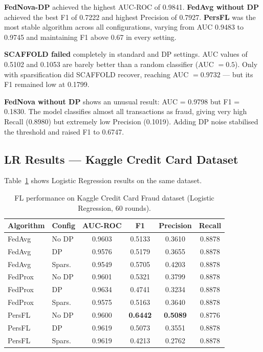 \documentclass[12pt, a4paper]{article}
\begin{document}
\textbf{FedNova-DP} achieved the highest AUC-ROC of 0.9841. \textbf{FedAvg without DP} achieved the best F1 of 0.7222 and highest Precision of 0.7927. \textbf{PersFL} was the most stable algorithm across all configurations, varying from AUC 0.9483 to 0.9745 and maintaining F1 above 0.67 in every setting.

\textbf{SCAFFOLD failed} completely in standard and DP settings. AUC values of 0.5102 and 0.1053 are barely better than a random classifier (AUC $= 0.5$). Only with sparsification did SCAFFOLD recover, reaching AUC $= 0.9732$ --- but its F1 remained low at 0.1799.

\textbf{FedNova without DP} shows an unusual result: AUC = 0.9798 but F1 = 0.1830. The model classifies almost all transactions as fraud, giving very high Recall (0.8980) but extremely low Precision (0.1019). Adding DP noise stabilised the threshold and raised F1 to 0.6747.

\subsection{LR Results --- Kaggle Credit Card Dataset}

Table~\ref{tab:lr_results} shows Logistic Regression results on the same dataset.

\begin{table}[H]
\centering
\caption{FL performance on Kaggle Credit Card Fraud dataset (Logistic Regression, 60 rounds).}
\label{tab:lr_results}
\begin{tabular}{llcccc}
\toprule
\textbf{Algorithm} & \textbf{Config} & \textbf{AUC-ROC} & \textbf{F1} & \textbf{Precision} & \textbf{Recall} \\
\midrule
FedAvg   & No DP  & 0.9603 & 0.5133          & 0.3610          & 0.8878 \\
FedAvg   & DP     & 0.9576 & 0.5179          & 0.3655          & 0.8878 \\
FedAvg   & Spars. & 0.9549 & 0.5705          & 0.4203          & 0.8878 \\
\midrule
FedProx  & No DP  & 0.9601 & 0.5321          & 0.3799          & 0.8878 \\
FedProx  & DP     & 0.9634 & 0.4741          & 0.3234          & 0.8878 \\
FedProx  & Spars. & 0.9575 & 0.5163          & 0.3640          & 0.8878 \\
\midrule
PersFL   & No DP  & 0.9600 & \textbf{0.6442} & \textbf{0.5089} & 0.8776 \\
PersFL   & DP     & 0.9619 & 0.5073          & 0.3551          & 0.8878 \\
PersFL   & Spars. & 0.9619 & 0.4213          & 0.2762          & 0.8878 \\
\bottomrule
\end{tabular}
\end{table}
\end{document}
